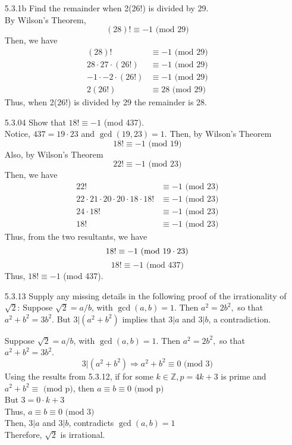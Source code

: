 \documentclass[12pt]{article}
\newcommand{\Z}{\mathds{Z}}
\begin{document}
\begin{enumerate}
	\item[5.3.1b] Find the remainder when 2(26!) is divided by 29.\\
		By Wilson's Theorem, 
		\[(28)! \equiv -1 \text{ (mod 29)}\]
		Then, we have
		\begin{align*}
		(28)! &\equiv -1 \text{ (mod 29)}\\
		28\cdot 27\cdot (26!) &\equiv-1 \text{ (mod 29)}\\
		-1\cdot-2\cdot(26!) &\equiv -1 \text{ (mod 29)}\\
		2(26!) &\equiv 28 \text{ (mod 29)}
		\end{align*}
		Thus,  when 2(26!) is divided by 29 the remainder is 28.
	\item[5.3.04] Show that $ 18! \equiv -1 $ (mod 437). \\
	Notice, $ 437 = 19\cdot 23 $ and $ \gcd(19,23)=1 $. Then, by Wilson's Theorem
	\[18!\equiv-1 \text{ (mod 19)}\]
	Also, by Wilson's Theorem
	\[22!\equiv-1 \text{ (mod 23)}\]
	Then, we have
	\begin{align*}
		22! &\equiv -1 \text{ (mod 23)}\\
		22\cdot 21\cdot 20\cdot 20 \cdot 18 \cdot 18! &\equiv -1 \text{ (mod 23)}\\
		24\cdot 18! &\equiv -1 \text{ (mod 23)}\\
		18! &\equiv -1 \text{ (mod 23)}
	\end{align*}
	Thus, from the two resultants, we have
	\[18!\equiv -1 \text{ (mod $ 19 \cdot 23 $)}\]
	\[18!\equiv -1 \text{ (mod 437)}\]
	Thus, $ 18! \equiv -1 $ (mod 437).
	\item[5.3.13] Supply any missing details in the following proof of the irrationality of $ \sqrt{2} $: Suppose $ \sqrt{2} = a/b $, with $ \gcd(a,b)=1 $. Then $ a^2=2b^2, $ so that $ a^2+b^2=3b^2 $. But $ 3 | (a^2+b^2) $ implies that $ 3|a $ and $ 3|b $, a contradiction.
	
	 Suppose $ \sqrt{2} = a/b $, with $ \gcd(a,b)=1 $. Then $ a^2=2b^2, $ so that $ a^2+b^2=3b^2 $.\[3 | (a^2+b^2) \Rightarrow a^2+b^2\equiv 0 \text{ (mod 3)}\]
	 Using the results from 5.3.12, if for some $k\in\Z, p=4k+3 $ is prime and $ a^2+b^2\equiv \text{ (mod p)} $, then $ a \equiv b \equiv 0 \text{ (mod p)} $\\
	 But $ 3=0\cdot k +3 $\\
	 Thus, $ a\equiv b\equiv 0 \text{ (mod 3)} $\\
	 Then,  $ 3|a $ and $ 3|b $, contradicts $ \gcd(a,b)=1 $\\
	 Therefore, $ \sqrt{2} $ is irrational.
	

\end{enumerate}
\end{document}
